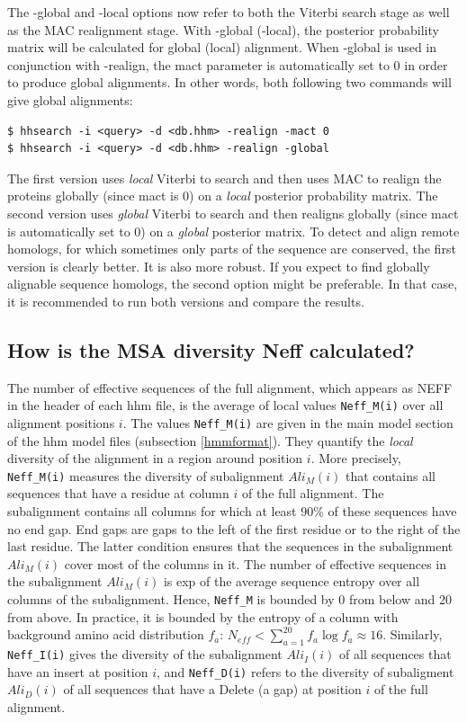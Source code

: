 \documentclass[11pt,a4paper]{article}
\begin{document}
The -global and -local options now refer to both the Viterbi search stage as 
well as the MAC realignment stage. With -global (-local), the posterior probability 
matrix will be calculated for global (local) alignment. When -global is used in 
conjunction with -realign, the mact parameter is automatically set to 0 in order to 
produce global alignments. In other words, both following two commands will give 
global alignments:
\begin{verbatim}
$ hhsearch -i <query> -d <db.hhm> -realign -mact 0
$ hhsearch -i <query> -d <db.hhm> -realign -global
\end{verbatim}

The first version uses \emph{local} Viterbi to search and then uses MAC to realign the 
proteins globally (since mact is 0) on a \emph{local} posterior probability matrix. The 
second version uses \emph{global} Viterbi to search and then realigns globally (since mact 
is automatically set to 0) on a \emph{global} posterior matrix. To detect and align remote 
homologs, for which sometimes only parts of the sequence are conserved, the first 
version is clearly better. It is also more robust. If you expect to find globally 
alignable sequence homologs, the second option might be preferable. In that case, 
it is recommended to run both versions and compare the results. 

\subsection{How is the MSA diversity Neff calculated?}
The number of effective sequences of the full alignment, which appears as NEFF in the header of each hhm file, is the average of local values \verb`Neff_M(i)` over all alignment positions $i$. The values \verb`Neff_M(i)` are given in the main model section of the hhm model files (subsection \ref{hmmformat}). They quantify the \emph{local} diversity of the alignment in a region around position $i$. More precisely, \verb`Neff_M(i)` measures the diversity of subalignment $Ali_M(i)$ that contains all sequences that have a residue at column $i$ of the full alignment. The subalignment contains all columns for which at least 90\% of these sequences have no end gap. End gaps are gaps to the left of the first residue or to the right of the last residue. The latter condition ensures that the sequences in the subalignment $Ali_M(i)$ cover most of the columns in it. The number of effective sequences in the subalignment $Ali_M(i)$ is exp of the average sequence entropy over all columns of the subalignment. Hence, \verb`Neff_M` is bounded by 0 from below and 20 from above. In practice, it is bounded by the entropy of a column with background amino acid distribution $f_a$: $N_{eff} < \sum_{a=1}^{20} f_a \log f_a \approx 16$. Similarly, \verb`Neff_I(i)` gives the diversity of the subalignment $Ali_I(i)$ of all sequences that have an insert at position $i$, and \verb`Neff_D(i)` refers to the diversity of subaligment $Ali_D(i)$ of all sequences that have a Delete (a gap) at position $i$ of the full alignment. 
\end{document}
